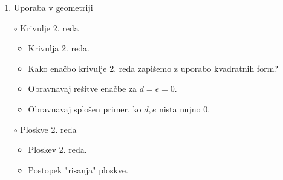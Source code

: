 \begin{enumerate}
    \item Uporaba v geometriji
    \item[$\circ$] Krivulje 2. reda 
    \begin{itemize}
        \item Krivulja 2. reda.
        \item Kako enačbo krivulje 2. reda zapišemo z uporabo kvadratnih form?
        \item Obravnavaj rešitve enačbe za $d=e=0$.
        \item Obravnavaj splošen primer, ko $d, e$ nista nujno $0$.
    \end{itemize}
    \item[$\circ$] Ploskve 2. reda 
    \begin{itemize}
        \item Ploskev 2. reda.
        \item Postopek "risanja" ploskve.
    \end{itemize}
\end{enumerate}